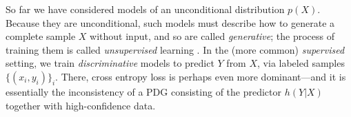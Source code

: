 \documentclass[twoside]{article}
\theoremstyle{plain}
\theoremstyle{definition}
\begin{document}
So far we have considered models of an unconditional distribution $p(X)$.
Because they are unconditional, such models must describe how to generate a complete sample $X$ without input, and so are called \emph{generative}; the process of training them is called \emph{unsupervised} learning \parencite{elts_stat_learn2009}.
In the (more common) \emph{supervised} setting, we train \emph{discriminative} models to predict $Y$ from $X$, via labeled samples $\{(x_i,y_i)\}_i$.
There, cross entropy loss is perhaps even more dominant---and it is essentially the inconsistency of a PDG consisting of the predictor $h(Y|X)$ together with high-confidence data.
\end{document}
